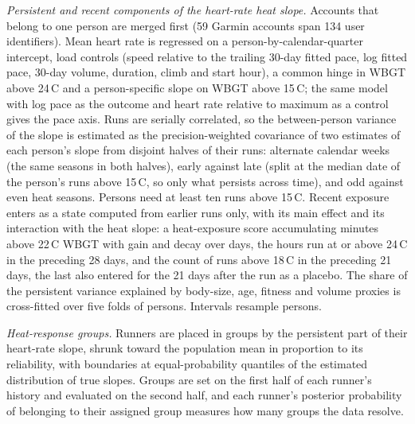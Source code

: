 \documentclass[11pt]{article}
\renewcommand{\_}{\textunderscore\allowbreak}
\begin{document}
\emph{Persistent and recent components of the heart-rate heat slope.} Accounts that belong to one person are merged first (59 Garmin accounts span 134 user identifiers). Mean heart rate is regressed on a person-by-calendar-quarter intercept, load controls (speed relative to the trailing 30-day fitted pace, log fitted pace, 30-day volume, duration, climb and start hour), a common hinge in WBGT above 24\,\textdegree C and a person-specific slope on WBGT above 15\,\textdegree C; the same model with log pace as the outcome and heart rate relative to maximum as a control gives the pace axis. Runs are serially correlated, so the between-person variance of the slope is estimated as the precision-weighted covariance of two estimates of each person's slope from disjoint halves of their runs: alternate calendar weeks (the same seasons in both halves), early against late (split at the median date of the person's runs above 15\,\textdegree C, so only what persists across time), and odd against even heat seasons. Persons need at least ten runs above 15\,\textdegree C. Recent exposure enters as a state computed from earlier runs only, with its main effect and its interaction with the heat slope: a heat-exposure score accumulating minutes above 22\,\textdegree C WBGT with gain and decay over days, the hours run at or above 24\,\textdegree C in the preceding 28 days, and the count of runs above 18\,\textdegree C in the preceding 21 days, the last also entered for the 21 days after the run as a placebo. The share of the persistent variance explained by body-size, age, fitness and volume proxies is cross-fitted over five folds of persons. Intervals resample persons.

\emph{Heat-response groups.} Runners are placed in groups by the persistent part of their heart-rate slope, shrunk toward the population mean in proportion to its reliability, with boundaries at equal-probability quantiles of the estimated distribution of true slopes. Groups are set on the first half of each runner's history and evaluated on the second half, and each runner's posterior probability of belonging to their assigned group measures how many groups the data resolve.
\end{document}
